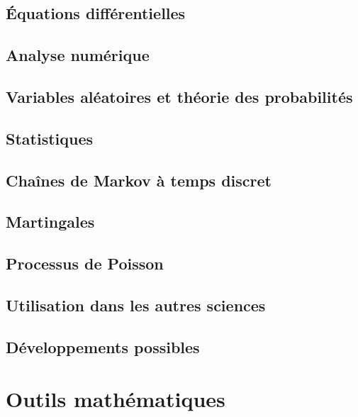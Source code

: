 \chapter{Équations différentielles}


\chapter{Analyse numérique}


\chapter{Variables aléatoires et théorie des probabilités}




\chapter{Statistiques}


\chapter{Chaînes de Markov à temps discret}


\chapter{Martingales}


\chapter{Processus de Poisson}


\chapter{Utilisation dans les autres sciences}


\chapter{Développements possibles}



%

%
\part{Outils mathématiques}        

